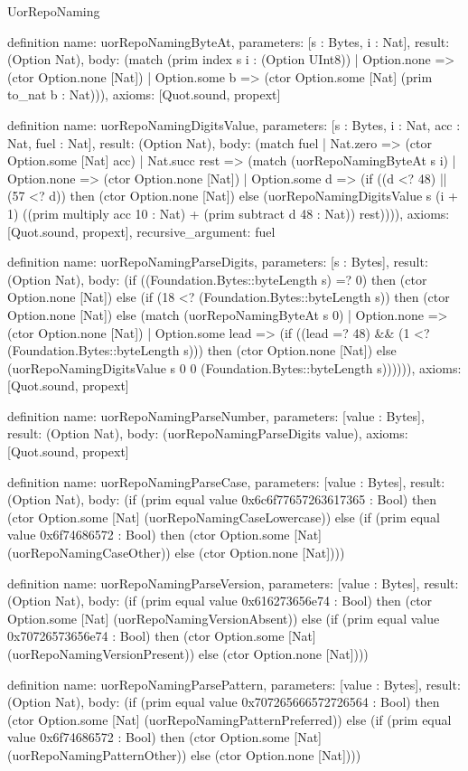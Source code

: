\begin{lexlean}{UorRepoNaming}
\begin{semanticmodule}
definition{
  name: uorRepoNamingByteAt,
  parameters: [s : Bytes, i : Nat],
  result: (Option Nat),
  body: (match (prim index s i : (Option UInt8))
    | Option.none => (ctor Option.none [Nat])
    | Option.some b => (ctor Option.some [Nat] (prim to_nat b : Nat))),
  axioms: [Quot.sound, propext]
}

definition{
  name: uorRepoNamingDigitsValue,
  parameters: [s : Bytes, i : Nat, acc : Nat, fuel : Nat],
  result: (Option Nat),
  body: (match fuel
    | Nat.zero => (ctor Option.some [Nat] acc)
    | Nat.succ rest => (match (uorRepoNamingByteAt s i)
      | Option.none => (ctor Option.none [Nat])
      | Option.some d => (if ((d <? 48) || (57 <? d)) then (ctor Option.none [Nat]) else (uorRepoNamingDigitsValue s (i + 1) ((prim multiply acc 10 : Nat) + (prim subtract d 48 : Nat)) rest)))),
  axioms: [Quot.sound, propext],
  recursive_argument: fuel
}

definition{
  name: uorRepoNamingParseDigits,
  parameters: [s : Bytes],
  result: (Option Nat),
  body: (if ((Foundation.Bytes::byteLength s) =? 0) then (ctor Option.none [Nat]) else (if (18 <? (Foundation.Bytes::byteLength s)) then (ctor Option.none [Nat]) else (match (uorRepoNamingByteAt s 0)
    | Option.none => (ctor Option.none [Nat])
    | Option.some lead => (if ((lead =? 48) && (1 <? (Foundation.Bytes::byteLength s))) then (ctor Option.none [Nat]) else (uorRepoNamingDigitsValue s 0 0 (Foundation.Bytes::byteLength s)))))),
  axioms: [Quot.sound, propext]
}

definition{
  name: uorRepoNamingParseNumber,
  parameters: [value : Bytes],
  result: (Option Nat),
  body: (uorRepoNamingParseDigits value),
  axioms: [Quot.sound, propext]
}

definition{
  name: uorRepoNamingParseCase,
  parameters: [value : Bytes],
  result: (Option Nat),
  body: (if (prim equal value 0x6c6f77657263617365 : Bool) then (ctor Option.some [Nat] (uorRepoNamingCaseLowercase)) else (if (prim equal value 0x6f74686572 : Bool) then (ctor Option.some [Nat] (uorRepoNamingCaseOther)) else (ctor Option.none [Nat])))
}

definition{
  name: uorRepoNamingParseVersion,
  parameters: [value : Bytes],
  result: (Option Nat),
  body: (if (prim equal value 0x616273656e74 : Bool) then (ctor Option.some [Nat] (uorRepoNamingVersionAbsent)) else (if (prim equal value 0x70726573656e74 : Bool) then (ctor Option.some [Nat] (uorRepoNamingVersionPresent)) else (ctor Option.none [Nat])))
}

definition{
  name: uorRepoNamingParsePattern,
  parameters: [value : Bytes],
  result: (Option Nat),
  body: (if (prim equal value 0x707265666572726564 : Bool) then (ctor Option.some [Nat] (uorRepoNamingPatternPreferred)) else (if (prim equal value 0x6f74686572 : Bool) then (ctor Option.some [Nat] (uorRepoNamingPatternOther)) else (ctor Option.none [Nat])))
}


\end{semanticmodule}
\end{lexlean}
